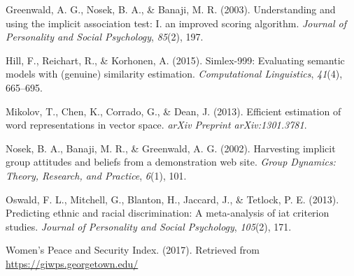 \documentclass[10pt, letterpaper]{article}
\begin{document}
\hypertarget{ref-greenwald2003understanding}{}
Greenwald, A. G., Nosek, B. A., \& Banaji, M. R. (2003). Understanding
and using the implicit association test: I. an improved scoring
algorithm. \emph{Journal of Personality and Social Psychology},
\emph{85}(2), 197.

\hypertarget{ref-hill2015simlex}{}
Hill, F., Reichart, R., \& Korhonen, A. (2015). Simlex-999: Evaluating
semantic models with (genuine) similarity estimation.
\emph{Computational Linguistics}, \emph{41}(4), 665--695.

\hypertarget{ref-mikolov2013efficient}{}
Mikolov, T., Chen, K., Corrado, G., \& Dean, J. (2013). Efficient
estimation of word representations in vector space. \emph{arXiv Preprint
arXiv:1301.3781}.

\hypertarget{ref-nosek2002harvesting}{}
Nosek, B. A., Banaji, M. R., \& Greenwald, A. G. (2002). Harvesting
implicit group attitudes and beliefs from a demonstration web site.
\emph{Group Dynamics: Theory, Research, and Practice}, \emph{6}(1), 101.

\hypertarget{ref-oswald2013predicting}{}
Oswald, F. L., Mitchell, G., Blanton, H., Jaccard, J., \& Tetlock, P. E.
(2013). Predicting ethnic and racial discrimination: A meta-analysis of
iat criterion studies. \emph{Journal of Personality and Social
Psychology}, \emph{105}(2), 171.

\hypertarget{ref-wps}{}
Women's Peace and Security Index. (2017). Retrieved from
\url{https://giwps.georgetown.edu/}
\end{document}

